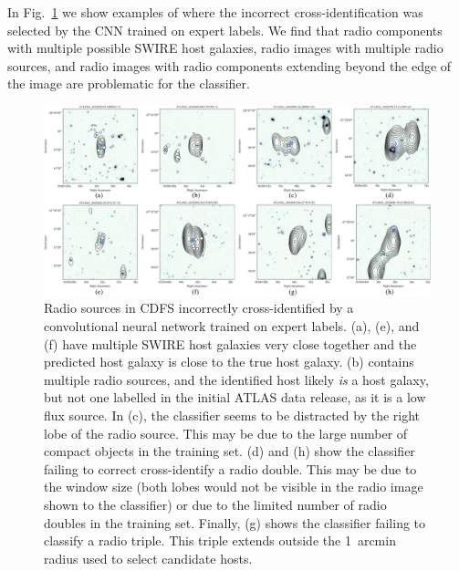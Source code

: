 \documentclass[fleqn,usenatbib,usedcolumn]{mnras}
\newcommand{\todo}[1]{ {\color{red}[{\bf TODO:~{#1}}]} }
\begin{document}
  In Fig.~\ref{fig:cnnexamples} we show examples of where the incorrect cross-identification was selected by the CNN trained on expert labels.  We find that radio components with multiple possible SWIRE host galaxies, radio images with multiple radio sources, and radio images with radio components extending beyond the edge of the image are problematic for the classifier. 
  
\begin{figure}
\includegraphics[width=\textwidth]{images/CNN-examples-CDFS.png}
    \caption{Radio sources in CDFS incorrectly cross-identified by a
      convolutional neural network trained on expert labels.
      (a), (e), and (f) have multiple SWIRE host galaxies very close
      together and the predicted host galaxy is close to the true host galaxy.
      (b) contains multiple radio sources, and the
      identified host likely \emph{is} a host galaxy, but not one labelled in
      the initial ATLAS data release, as it is a low flux source. In
      (c), the classifier seems to be distracted by the
      right lobe of the radio source. This may be due to the large number of
      compact objects in the training set.
      (d) and (h) show the
      classifier failing to correct cross-identify a radio double. This may be
      due to the window size (both lobes would not be visible in the radio image
      shown to the classifier) or due to the limited number of radio doubles in
      the training set. Finally,
     (g) shows the classifier failing to classify a radio
      triple. This triple extends outside the 1~arcmin radius used to select
      candidate hosts.}\label{fig:cnnexamples}
\end{figure}

 
\end{document}
